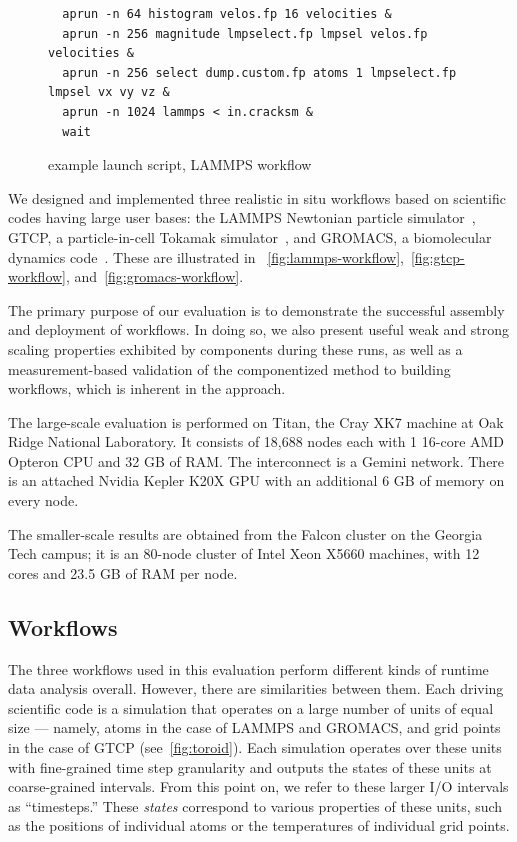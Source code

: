 \begin{figure}
  \begin{lstlisting}
  aprun -n 64 histogram velos.fp 16 velocities &
  aprun -n 256 magnitude lmpselect.fp lmpsel velos.fp velocities &
  aprun -n 256 select dump.custom.fp atoms 1 lmpselect.fp lmpsel vx vy vz &
  aprun -n 1024 lammps < in.cracksm &
  wait
  \end{lstlisting}
  \caption{\sys example launch script, LAMMPS workflow}
  \label{fig:launch-script}
\end{figure}

We designed and implemented three realistic in situ workflows based on
scientific codes having large user bases: the LAMMPS Newtonian particle
simulator~\cite{plimpton:1997:lammps}, GTCP, a particle-in-cell Tokamak
simulator~\cite{lin:gtc}, and GROMACS,
a biomolecular dynamics code~\cite{hess2008gromacs}.
These are illustrated in
~\autoref{fig:lammps-workflow},~\autoref{fig:gtcp-workflow},
and~\autoref{fig:gromacs-workflow}.

The primary purpose of our evaluation is to demonstrate the
successful assembly and deployment of \sys workflows. In doing so, 
we also present useful
weak and strong scaling properties exhibited by \sys components
during these runs, as well as a measurement-based validation of
the componentized method to building workflows, which is inherent in the \sys approach.

The large-scale evaluation is performed on Titan, the Cray XK7 machine at Oak Ridge
National Laboratory. It consists of 18,688 nodes each with 1 16-core AMD
Opteron CPU and 32 GB of RAM. The interconnect is a Gemini network. There is an
attached Nvidia Kepler K20X GPU with an additional 6 GB of memory on every
node.

The smaller-scale results are obtained from the Falcon cluster
on the Georgia Tech campus; it is an 80-node cluster of Intel Xeon X5660 machines,
with 12 cores and 23.5 GB of RAM per node. 

\subsection{Workflows}

The three \sys workflows used in this evaluation perform
different kinds of runtime data analysis overall.
However, there are similarities between them.
Each driving scientific code is a simulation that
operates on a large number of units of equal size --- namely, atoms
in the case of LAMMPS and GROMACS, and grid points
in the case of GTCP (see~\autoref{fig:toroid}).
Each simulation operates over these units
with fine-grained time step granularity
and outputs the states of these units at coarse-grained
intervals. From this point on, we refer to these larger
I/O intervals as ``timesteps.''
These \textit{states} correspond to various properties
of these units, such as the positions of individual atoms or the
temperatures of individual grid points.

